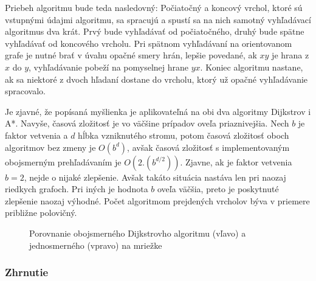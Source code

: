 Priebeh algoritmu bude teda nasledovný: Počiatočný a koncový vrchol, ktoré sú vstupnými údajmi algoritmu, sa spracujú a spustí sa na nich samotný vyhľadávací algoritmus dva krát. Prvý bude vyhľadávať od počiatočného, druhý bude spätne vyhľadávať od koncového vrcholu. Pri spätnom vyhľadávaní na orientovanom grafe je nutné brať v úvahu opačné smery hrán, lepšie povedané, ak $xy$ je hrana z $x$ do $y$, vyhľadávanie pobeží na pomyselnej hrane $yx$. Koniec algoritmu nastane, ak sa niektoré z dvoch hľadaní dostane do vrcholu, ktorý už opačné vyhľadávanie spracovalo.\newline

Je zjavné, že popísaná myšlienka je aplikovateľná na obi dva algoritmy \textendash Dijkstrov i A*. Navyše, časová zložitosť je vo väčšine prípadov oveľa priaznivejšia. Nech $b$ je faktor vetvenia a $d$ hĺbka vzniknutého stromu, potom časová zložitosť oboch algoritmov bez zmeny je $O(b^{d})$, avšak časová zložitosť s implementovaným obojsmerným prehľadávaním je $O(2.(b^{d/2}))$. Zjavne, ak je faktor vetvenia $b = 2$, nejde o nijaké zlepšenie. Avšak takáto situácia nastáva len pri naozaj riedkych grafoch. Pri iných je hodnota $b$ oveľa väčšia, preto je poskytnuté zlepšenie naozaj výhodné. Počet algoritmom prejdených vrcholov býva v priemere približne polovičný. \newline

\begin{figure}[H]
  \caption{Porovnanie obojsmerného Dijkstrovho algoritmu (vľavo) a jednosmerného (vpravo) na mriežke}
  \label{Bidiretional_Dijkstra}
\end{figure}


\subsubsection{Zhrnutie}

